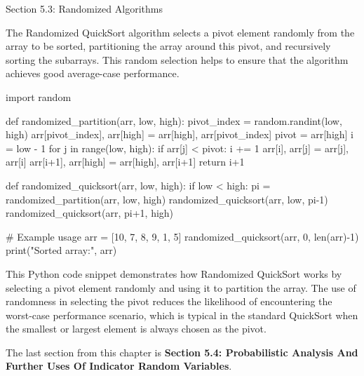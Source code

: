 \begin{notes}{Section 5.3: Randomized Algorithms}
    \begin{highlight}
        The Randomized QuickSort algorithm selects a pivot element randomly from the array to be sorted, partitioning the array around this pivot, and recursively sorting the subarrays. This random 
        selection helps to ensure that the algorithm achieves good average-case performance.
    \begin{code}[Python]
    import random

    def randomized_partition(arr, low, high):
        pivot_index = random.randint(low, high)
        arr[pivot_index], arr[high] = arr[high], arr[pivot_index]
        pivot = arr[high]
        i = low - 1
        for j in range(low, high):
            if arr[j] < pivot:
                i += 1
                arr[i], arr[j] = arr[j], arr[i]
        arr[i+1], arr[high] = arr[high], arr[i+1]
        return i+1

    def randomized_quicksort(arr, low, high):
        if low < high:
            pi = randomized_partition(arr, low, high)
            randomized_quicksort(arr, low, pi-1)
            randomized_quicksort(arr, pi+1, high)

    # Example usage
    arr = [10, 7, 8, 9, 1, 5]
    randomized_quicksort(arr, 0, len(arr)-1)
    print("Sorted array:", arr)
    \end{code}

        This Python code snippet demonstrates how Randomized QuickSort works by selecting a pivot element randomly and using it to partition the array. The use of randomness in selecting the pivot 
        reduces the likelihood of encountering the worst-case performance scenario, which is typical in the standard QuickSort when the smallest or largest element is always chosen as the pivot.
    \end{highlight}
\end{notes}

The last section from this chapter is \textbf{Section 5.4: Probabilistic Analysis And Further Uses Of Indicator Random Variables}.

